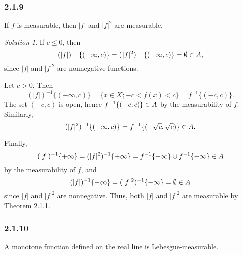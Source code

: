 \documentclass{report}
\let\cal\relax
\newcommand{\cal}[1]{\mathcal{#1}}
\theoremstyle{remark}
\newtheorem*{solution}{Solution}
\begin{document}
\subsubsection*{2.1.9}
If $f$ is measurable, then $|f|$ and $|f|^2$ are measurable.

\begin{solution}
  If $c \le 0$, then
  \begin{equation*}
    (|f|)^{-1}\{(-\infty, c)\} = (|f|^2)^{-1}\{(-\infty, c)\} = \emptyset \in \cal A,
  \end{equation*}
  since $|f|$ and $|f|^2$ are nonnegative functions.
  
  Let $c > 0$. Then
  \begin{equation*}
    (|f|)^{-1}\{(-\infty, c)\} = \{x \in X; -c < f(x) < c\} = f^{-1}\{(-c,c)\}.
  \end{equation*}
  The set $(-c,c)$ is open, hence $f^{-1}\{(-c,c)\} \in \cal A$ by the measurability of $f$. Similarly,
  \begin{equation*}
    (|f|^2)^{-1}\{(-\infty, c)\} = f^{-1}\{(-\sqrt c, \sqrt c)\} \in \cal A.
  \end{equation*}

  Finally,
  \begin{equation*}
    (|f|)^{-1}\{+\infty\} = (|f|^2)^{-1}\{+\infty\} = f^{-1}\{+\infty\} \cup f^{-1}\{-\infty\} \in \cal A
  \end{equation*}
  by the measurability of $f$, and
  \begin{equation*}
    (|f|)^{-1}\{-\infty\} = (|f|^2)^{-1}\{-\infty\} = \emptyset \in \cal A
  \end{equation*}
  since $|f|$ and $|f|^2$ are nonnegative. Thus, both $|f|$ and $|f|^2$ are measurable by Theorem 2.1.1.
\end{solution}

\subsubsection*{2.1.10}
A monotone function defined on the real line is Lebesgue-measurable.
\end{document}
